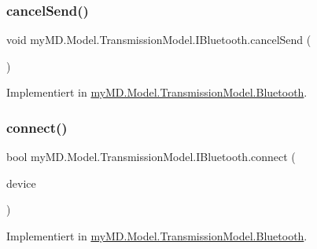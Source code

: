 \subsubsection{\texorpdfstring{cancel\+Send()}{cancelSend()}}
{\footnotesize\ttfamily void my\+M\+D.\+Model.\+Transmission\+Model.\+I\+Bluetooth.\+cancel\+Send (\begin{DoxyParamCaption}{ }\end{DoxyParamCaption})}



Implementiert in \mbox{\hyperlink{classmy_m_d_1_1_model_1_1_transmission_model_1_1_bluetooth_aaf2c47cc102234818e414fe362ea14a7}{my\+M\+D.\+Model.\+Transmission\+Model.\+Bluetooth}}.

\mbox{\label{interfacemy_m_d_1_1_model_1_1_transmission_model_1_1_i_bluetooth_a02d846b9c9b31d1ea1d35780928c3ba4}} 
\subsubsection{\texorpdfstring{connect()}{connect()}}
{\footnotesize\ttfamily bool my\+M\+D.\+Model.\+Transmission\+Model.\+I\+Bluetooth.\+connect (\begin{DoxyParamCaption}\item[{\mbox{\hyperlink{interfacemy_m_d_1_1_model_interface_1_1_transmission_model_interface_1_1_i_device}{I\+Device}}}]{device }\end{DoxyParamCaption})}



Implementiert in \mbox{\hyperlink{classmy_m_d_1_1_model_1_1_transmission_model_1_1_bluetooth_add794d082480db984a9d49630d1e5bba}{my\+M\+D.\+Model.\+Transmission\+Model.\+Bluetooth}}.

\mbox{\label{interfacemy_m_d_1_1_model_1_1_transmission_model_1_1_i_bluetooth_a8bb41d3ca3ff3264de397bccd555e8b8}} 
